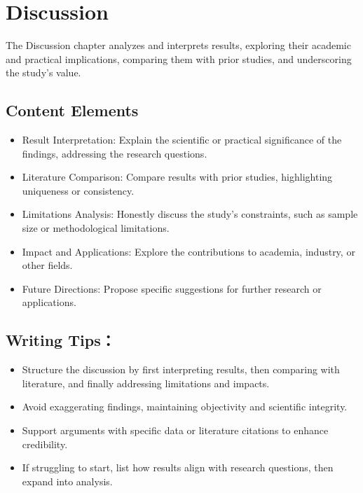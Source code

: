 \chapter{Discussion}

The Discussion chapter analyzes and interprets results, exploring their academic and practical implications, comparing them with prior studies, and underscoring the study’s value.

    
\section{Content Elements}
\begin{itemize}
    \item Result Interpretation: Explain the scientific or practical significance of the findings, addressing the research questions.
    \item Literature Comparison: Compare results with prior studies, highlighting uniqueness or consistency.
    \item Limitations Analysis: Honestly discuss the study’s constraints, such as sample size or methodological limitations.
    \item Impact and Applications: Explore the contributions to academia, industry, or other fields.
    \item Future Directions: Propose specific suggestions for further research or applications.
\end{itemize}

\section{Writing Tips：}
\begin{itemize}
    \item Structure the discussion by first interpreting results, then comparing with literature, and finally addressing limitations and impacts.
    \item Avoid exaggerating findings, maintaining objectivity and scientific integrity.
    \item Support arguments with specific data or literature citations to enhance credibility.
    \item If struggling to start, list how results align with research questions, then expand into analysis.

\end{itemize}
